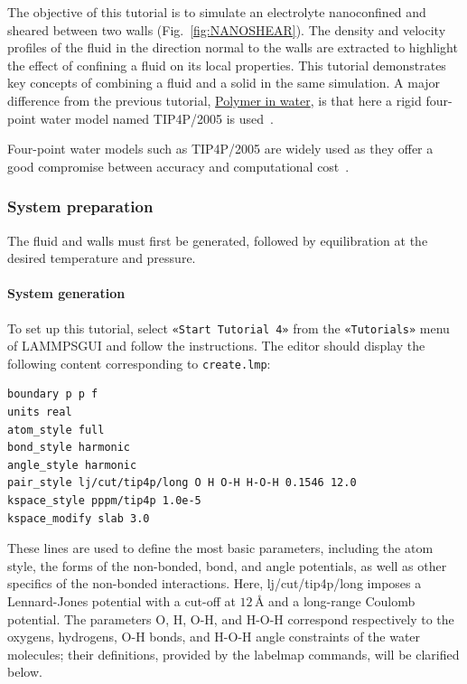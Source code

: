 \documentclass[9pt,tutorial]{livecoms}
\newcommand{\lmpcmd}[1]{\colorbox{listing}{\textcolor{command}{\small{#1}}}} %
\newcommand{\flecmd}[1]{\textcolor{command}{\texttt{#1}}} %
\newcommand{\guicmd}[1]{\textcolor{command}{\texttt{«#1»}}} %
\newcommand{\lammpsgui}{\textsf{LAMMPS\textendash GUI}}
\begin{document}
The objective of this tutorial is to simulate an electrolyte
nanoconfined and sheared between two walls (Fig.~\ref{fig:NANOSHEAR}).  The density
and velocity profiles of the fluid in the direction normal to the walls are
extracted to highlight the effect of confining a fluid on its local properties.
This tutorial demonstrates key concepts of combining a fluid and a solid in
the same simulation.  A major difference from the previous tutorial,
\hyperref[all-atom-label]{Polymer in water}, is that here a rigid four-point
water model named TIP4P/2005 is used~\cite{abascal2005general}.

\begin{note}
  Four-point water models such as TIP4P/2005 are widely used as they offer a
  good compromise between accuracy and computational cost~\cite{kadaoluwa2021systematic}.
\end{note}

\subsubsection{System preparation}

The fluid and walls must first be generated, followed by equilibration at the
desired temperature and pressure.

\paragraph{System generation}

To set up this tutorial, select \guicmd{Start Tutorial 4} from the
\guicmd{Tutorials} menu of \lammpsgui{} and follow the instructions.
The editor should display the following content corresponding to \flecmd{create.lmp}:
\begin{lstlisting}
boundary p p f
units real
atom_style full
bond_style harmonic
angle_style harmonic
pair_style lj/cut/tip4p/long O H O-H H-O-H 0.1546 12.0
kspace_style pppm/tip4p 1.0e-5
kspace_modify slab 3.0
\end{lstlisting}
These lines are used to define the most basic parameters, including the 
atom style, the forms of the non-bonded, bond, and angle potentials, 
as well as other specifics of the non-bonded interactions.  Here, \lmpcmd{lj/cut/tip4p/long}
imposes a Lennard-Jones potential with a cut-off at $12\,\text{\AA{}}$ and a long-range
Coulomb potential.  The parameters \lmpcmd{O}, \lmpcmd{H}, \lmpcmd{O-H},
and \lmpcmd{H-O-H} correspond respectively to the oxygens, hydrogens, O-H bonds, and
H-O-H angle constraints of the water molecules; their definitions, provided by the
\lmpcmd{labelmap} commands, will be clarified below.
\end{document}
